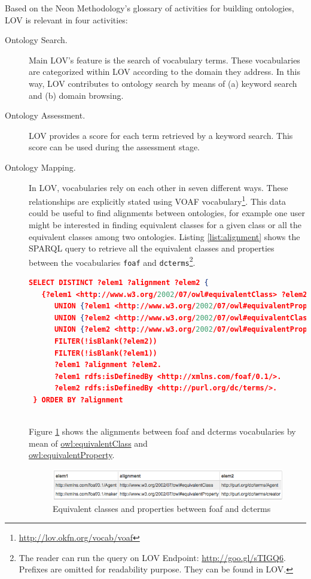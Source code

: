 \documentclass{iosart2c}
\begin{document}
Based on the Neon Methodology's glossary of activities for building ontologies, LOV is relevant in four activities:

\begin{description}

 \item [Ontology Search.] Main LOV's feature is the search of vocabulary terms. These vocabularies are categorized within LOV according to the domain they address. In this way, LOV contributes to ontology search by means of (a) keyword search and (b) domain browsing.
 \item [Ontology Assessment.] LOV provides a score for each term retrieved by a keyword search. This score can be used during the assessment stage.
 \item [Ontology Mapping.] In LOV, vocabularies rely on each other in seven different ways. These relationships are explicitly stated using VOAF vocabulary\footnote{\url{http://lov.okfn.org/vocab/voaf}}. This data could be useful to find alignments between ontologies, for example one user might be interested in finding equivalent classes for a given class or all the equivalent classes among two ontologies. Listing \ref{list:alignment} shows the SPARQL query to retrieve all the equivalent classes and properties between the vocabularies \texttt{foaf} and \texttt{dcterms}\footnote{The reader can run the query on LOV Endpoint: \url{http://goo.gl/sTIGQ6}. Prefixes are omitted for readability purpose. They can be found in LOV.}.
     
 \begin{lstlisting}[basicstyle=\tiny,float=htb,caption={SPARQL query asking for all the equivalent classes and properties between the vocabularies foaf and dcterms. },label=list:alignment, language=json]
 SELECT DISTINCT ?elem1 ?alignment ?elem2 {
   {?elem1 <http://www.w3.org/2002/07/owl#equivalentClass> ?elem2}
      UNION {?elem1 <http://www.w3.org/2002/07/owl#equivalentProperty> ?elem2}
      UNION {?elem2 <http://www.w3.org/2002/07/owl#equivalentClass> ?elem1}
      UNION {?elem2 <http://www.w3.org/2002/07/owl#equivalentProperty> ?elem1}
      FILTER(!isBlank(?elem2))
      FILTER(!isBlank(?elem1))
      ?elem1 ?alignment ?elem2.
      ?elem1 rdfs:isDefinedBy <http://xmlns.com/foaf/0.1/>.
      ?elem2 rdfs:isDefinedBy <http://purl.org/dc/terms/>.
 } ORDER BY ?alignment
	
	\end{lstlisting}
	
	Figure \ref{fig:eqCR} shows the alignments between foaf and dcterms vocabularies by mean of \url{owl:equivalentClass} and \\ \url{owl:equivalentProperty}.
    \begin{figure}
      \centering
      \includegraphics[width=1.0\linewidth]{equivalentCandR.png}
      \caption{Equivalent classes and properties between foaf and dcterms}
      \label{fig:eqCR}
    \end{figure}
    

\end{description}
\end{document}
